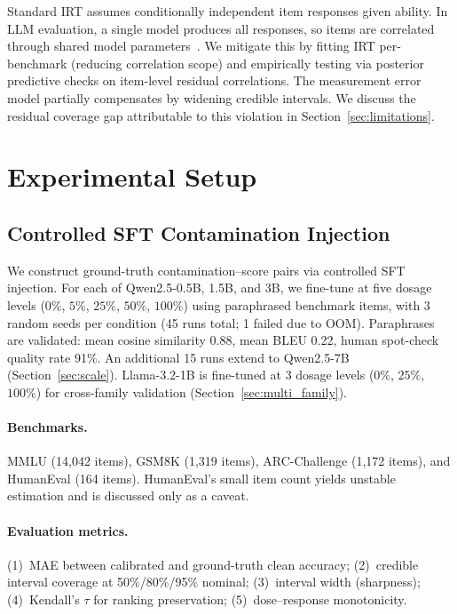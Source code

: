 \documentclass[letterpaper]{article}
\begin{document}
Standard IRT assumes conditionally independent item responses given ability.
In LLM evaluation, a single model produces all responses, so items are correlated through shared model parameters~\citep{mislevy1986recent}.
We mitigate this by fitting IRT per-benchmark (reducing correlation scope) and empirically testing via posterior predictive checks on item-level residual correlations.
The measurement error model partially compensates by widening credible intervals.
We discuss the residual coverage gap attributable to this violation in Section~\ref{sec:limitations}.

\section{Experimental Setup}
\label{sec:setup}

\subsection{Controlled SFT Contamination Injection}
\label{sec:injection}

We construct ground-truth contamination--score pairs via controlled SFT injection.
For each of Qwen2.5-0.5B, 1.5B, and 3B, we fine-tune at five dosage levels ($0\%$, $5\%$, $25\%$, $50\%$, $100\%$) using paraphrased benchmark items, with 3 random seeds per condition (45 runs total; 1 failed due to OOM).
Paraphrases are validated: mean cosine similarity 0.88, mean BLEU 0.22, human spot-check quality rate 91\%.
An additional 15 runs extend to Qwen2.5-7B (Section~\ref{sec:scale}).
Llama-3.2-1B is fine-tuned at 3 dosage levels ($0\%$, $25\%$, $100\%$) for cross-family validation (Section~\ref{sec:multi_family}).

\paragraph{Benchmarks.} MMLU (14,042 items), GSM8K (1,319 items), ARC-Challenge (1,172 items), and HumanEval (164 items).
HumanEval's small item count yields unstable estimation and is discussed only as a caveat.

\paragraph{Evaluation metrics.} (1)~MAE between calibrated and ground-truth clean accuracy; (2)~credible interval coverage at 50\%/80\%/95\% nominal; (3)~interval width (sharpness); (4)~Kendall's $\tau$ for ranking preservation; (5)~dose--response monotonicity.
\end{document}
